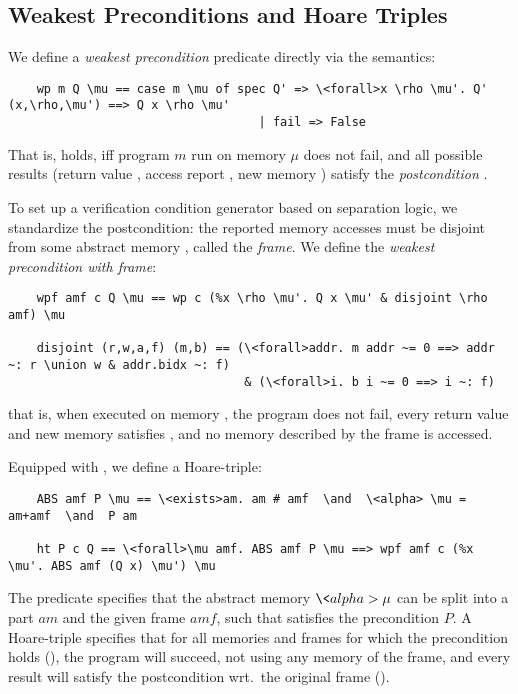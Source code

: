 \documentclass[sn-mathphys,Numbered]{sn-jnl}
\theoremstyle{thmstyleone}%
\theoremstyle{definition}%
\theoremstyle{thmstylethree}%
\begin{document}
  \subsection{Weakest Preconditions and Hoare Triples}\label{sec:wp_hoare}
  We define a \emph{weakest precondition} predicate directly via the semantics:
  \begin{lstlisting}
    wp m Q \mu == case m \mu of spec Q' => \<forall>x \rho \mu'. Q' (x,\rho,\mu') ==> Q x \rho \mu'
                                   | fail => False
  \end{lstlisting}
  That is,  holds, iff program \is$m$ run on memory \is$\mu$ does not fail, and all possible results (return value , access report \is{\rho}, new memory )
  satisfy the \emph{postcondition} .

  To set up a verification condition generator based on separation logic,
  we standardize the postcondition: the reported memory accesses must be disjoint
  from some abstract memory , called the \emph{frame}. We define the
  \emph{weakest precondition with frame}:
  \begin{lstlisting}
    wpf amf c Q \mu == wp c (%x \rho \mu'. Q x \mu' & disjoint \rho amf) \mu

    disjoint (r,w,a,f) (m,b) == (\<forall>addr. m addr ~= 0 ==> addr ~: r \union w & addr.bidx ~: f)
                                 & (\<forall>i. b i ~= 0 ==> i ~: f)
  \end{lstlisting}
  that is, when executed on memory \is{\mu}, the program  does not fail, every return value  and new memory  satisfies ,
  and no memory described by the frame  is accessed.

  Equipped with , we define a Hoare-triple:
  \begin{lstlisting}
    ABS amf P \mu == \<exists>am. am # amf  \and  \<alpha> \mu = am+amf  \and  P am

    ht P c Q == \<forall>\mu amf. ABS amf P \mu ==> wpf amf c (%x \mu'. ABS amf (Q x) \mu') \mu
  \end{lstlisting}
  The predicate  specifies that the abstract memory \is$\<alpha> \mu$ can be
  split into a part \is$am$ and the given frame \is$amf$, such that  satisfies the precondition $P$.
  A Hoare-triple  specifies that for all memories and frames
  for which the precondition holds (), the program will succeed,
  not using any memory of the frame, and every result will satisfy the postcondition
  wrt.\ the original frame ().
\end{document}
